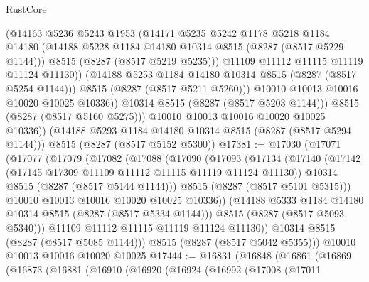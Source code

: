 \begin{lexlean}{RustCore}
\begin{coremodule}
                    (@14163
                      @5236
                      @5243
                      @1953
                      (@14171
                        @5235
                        @5242
                        @1178
                        @5218
                        @1184
                        @14180
                        (@14188 @5228 @1184 @14180 @10314 @8515 (@8287 (@8517 @5229 @1144)))
                        @8515
                        (@8287 (@8517 @5219 @5235)))
                      @11109
                      @11112
                      @11115
                      @11119
                      @11124
                      @11130))
                  (@14188 @5253 @1184 @14180 @10314 @8515 (@8287 (@8517 @5254 @1144)))
                  @8515
                  (@8287 (@8517 @5211 @5260)))
                @10010
                @10013
                @10016
                @10020
                @10025
                @10336))
            @10314
            @8515
            (@8287 (@8517 @5203 @1144)))
          @8515
          (@8287 (@8517 @5160 @5275)))
        @10010
        @10013
        @10016
        @10020
        @10025
        @10336))
    (@14188 @5293 @1184 @14180 @10314 @8515 (@8287 (@8517 @5294 @1144)))
    @8515
    (@8287 (@8517 @5152 @5300))
@17381 := @17030
    (@17071
      (@17077
        (@17079
          (@17082
            (@17088
              (@17090
                (@17093
                  (@17134
                    (@17140
                      (@17142 (@17145 @17309 @11109 @11112 @11115 @11119 @11124 @11130))
                      @10314
                      @8515
                      (@8287 (@8517 @5144 @1144)))
                    @8515
                    (@8287 (@8517 @5101 @5315)))
                  @10010
                  @10013
                  @10016
                  @10020
                  @10025
                  @10336))
              (@14188 @5333 @1184 @14180 @10314 @8515 (@8287 (@8517 @5334 @1144)))
              @8515
              (@8287 (@8517 @5093 @5340)))
            @11109
            @11112
            @11115
            @11119
            @11124
            @11130))
        @10314
        @8515
        (@8287 (@8517 @5085 @1144)))
      @8515
      (@8287 (@8517 @5042 @5355)))
    @10010
    @10013
    @10016
    @10020
    @10025
@17444 := @16831
    (@16848
      (@16861
        (@16869
          (@16873
            (@16881
              (@16910
                (@16920
                  (@16924
                    (@16992
                      (@17008
                        (@17011

\end{coremodule}
\end{lexlean}

